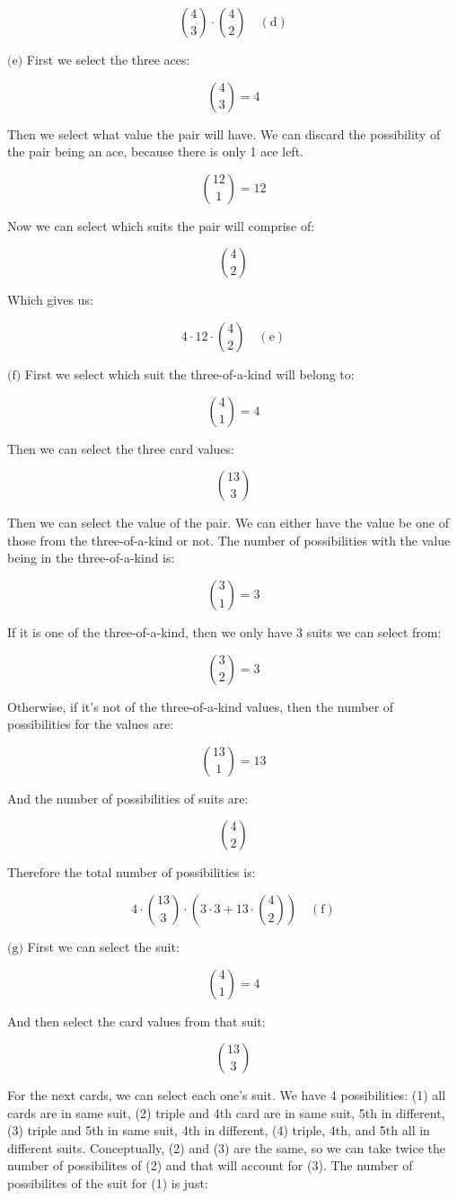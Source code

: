 \documentclass{article}
\newcommand{\subproblem}[1]{$\boxed{\text{(#1)}}$}
\newcommand{\subsolution}[2]{\boxed{#2\quad(\text{#1})}}
\begin{document}
\begin{multicols*}{2}
\[
\subsolution{d}{\binom{4}{3}\cdot\binom{4}{2}}
\]

%
\subproblem{e} First we select the three aces:

\[
\binom{4}{3}=4
\]

Then we select what value the pair will have. We can discard the
possibility of the pair being an ace, because there is only 1 ace
left.

\[
\binom{12}{1}=12
\]

Now we can select which suits the pair will comprise of:

\[
\binom{4}{2}
\]

Which gives us:

\[
\subsolution{e}{4\cdot12\cdot\binom{4}{2}}
\]

%
\subproblem{f} First we select which suit the three-of-a-kind will
belong to:

\[
\binom{4}{1}=4
\]

Then we can select the three card values:

\[
\binom{13}{3}
\]

Then we can select the value of the pair. We can either have the value
be one of those from the three-of-a-kind or not. The number of
possibilities with the value being in the three-of-a-kind is:

\[
\binom{3}{1}=3
\]

If it is one of the three-of-a-kind, then we only have 3 suits we can
select from:

\[
\binom{3}{2}=3
\]

Otherwise, if it's not of the three-of-a-kind values, then the number
of possibilities for the values are:

\[
\binom{13}{1}=13
\]

And the number of possibilities of suits are:

\[
\binom{4}{2}
\]

Therefore the total number of possibilities is:

\[
\subsolution{f}{4\cdot\binom{13}{3}\cdot\left(3\cdot3+13\cdot\binom{4}{2}\right)}
\]

%
\subproblem{g} First we can select the suit:

\[
\binom{4}{1}=4
\]

And then select the card values from that suit:

\[
\binom{13}{3}
\]

For the next cards, we can select each one's suit. We have 4
possibilities: (1) all cards are in same suit, (2) triple and 4th card
are in same suit, 5th in different, (3) triple and 5th in same suit,
4th in different, (4) triple, 4th, and 5th all in different
suits. Conceptually, (2) and (3) are the same, so we can take twice
the number of possibilites of (2) and that will account for (3). The
number of possibilites of the suit for (1) is just:


\end{multicols*}
\end{document}
